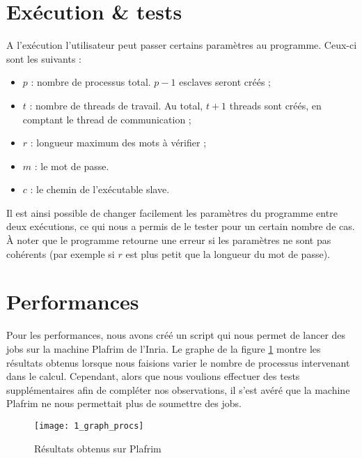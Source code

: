 \section{Exécution \& tests} %
\label{sec:execution}

A l'exécution l'utilisateur peut passer certains paramètres au programme. Ceux-ci sont les suivants :
\begin{itemize}
	\item $p$ : nombre de processus total. $p-1$ esclaves seront créés ;
	\item $t$ : nombre de threads de travail. Au total, $t+1$ threads sont créés, en comptant le thread de communication ;
	\item $r$ : longueur maximum des mots à vérifier ;
	\item $m$ : le mot de passe.
	\item $c$ : le chemin de l'exécutable \og slave\fg .
\end{itemize}

Il est ainsi possible de changer facilement les paramètres du programme entre deux exécutions, ce qui nous a permis de le tester pour un certain nombre de cas. \`A noter que le programme retourne une erreur si les paramètres ne sont pas cohérents (par exemple si $r$ est plus petit que la longueur du mot de passe).


\section{Performances} %
\label{sec:perf}

Pour les performances, nous avons créé un script qui nous permet de lancer des jobs sur la machine Plafrim de l'Inria. Le graphe de la figure \ref{fig:graph_procs} montre les résultats obtenus lorsque nous faisions varier le nombre de processus intervenant dans le calcul. Cependant, alors que nous voulions effectuer des tests supplémentaires afin de compléter nos observations, il s'est avéré que la machine Plafrim ne nous permettait plus de soumettre des jobs. 

\begin{figure}[h!]
\centering
\texttt{[image: 1\_graph\_procs]}
\caption{Résultats obtenus sur Plafrim}
\label{fig:graph_procs}
\end{figure}

